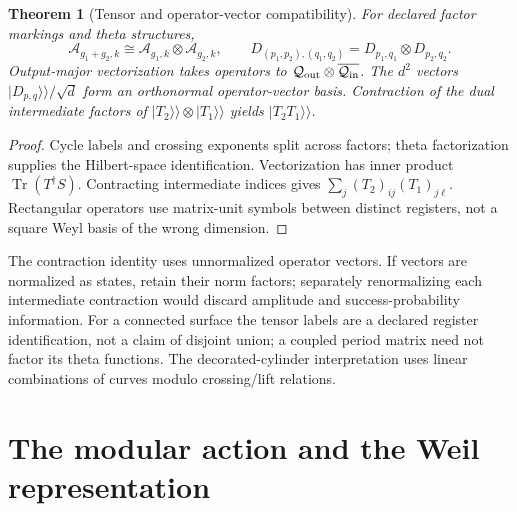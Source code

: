 \documentclass[11pt]{article}
\newtheorem{theorem}{Theorem}[section]
\theoremstyle{definition}
\theoremstyle{remark}
\newcommand{\Tr}{\operatorname{Tr}}
\begin{document}
\begin{theorem}[Tensor and operator-vector compatibility]\label{thm:geometric-tensor}
For declared factor markings and theta structures,
\[
 \mathcal A_{g_1+g_2,k}\cong\mathcal A_{g_1,k}\otimes\mathcal A_{g_2,k},
 \qquad D_{(p_1,p_2),(q_1,q_2)}=D_{p_1,q_1}\otimes D_{p_2,q_2}.
\]
Output-major vectorization takes operators to
$\mathcal Q_{\rm out}\otimes\overline{\mathcal Q_{\rm in}}$.
The $d^2$ vectors $|D_{p,q}\rangle\!\rangle/\sqrt d$ form an orthonormal
operator-vector basis. Contraction of the dual intermediate factors of
$|T_2\rangle\!\rangle\otimes|T_1\rangle\!\rangle$ yields
$|T_2T_1\rangle\!\rangle$.
\end{theorem}
\begin{proof}
Cycle labels and crossing exponents split across factors; theta
factorization supplies the Hilbert-space identification. Vectorization
has inner product $\Tr(T^\dagger S)$. Contracting intermediate indices
gives $\sum_j(T_2)_{ij}(T_1)_{j\ell}$. Rectangular operators use
matrix-unit symbols between distinct registers, not a square Weyl basis
of the wrong dimension.
\end{proof}
The contraction identity uses unnormalized operator vectors. If vectors
are normalized as states, retain their norm factors; separately
renormalizing each intermediate contraction would discard amplitude and
success-probability information.
For a connected surface the tensor labels are a declared register
identification, not a claim of disjoint union; a coupled period matrix
need not factor its theta functions. The decorated-cylinder interpretation
uses linear combinations of curves modulo crossing/lift relations.

\section{The modular action and the Weil representation}\label{sec:weil}
\end{document}
